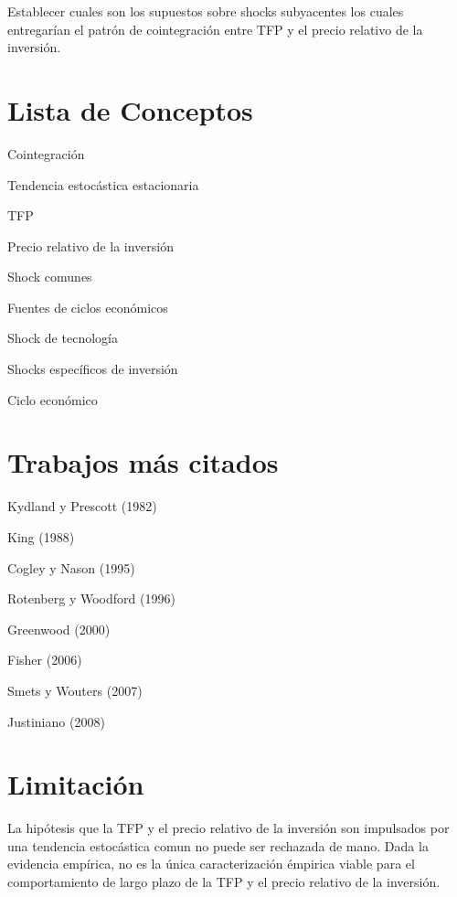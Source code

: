 \documentclass{article}
\begin{document}
Establecer cuales son los supuestos sobre shocks subyacentes los cuales entregarían el patrón de cointegración entre TFP y el precio relativo de la inversión.

\section{Lista de Conceptos}

Cointegración

Tendencia estocástica estacionaria

TFP

Precio relativo de la inversión

Shock comunes

Fuentes de ciclos económicos

Shock de tecnología

Shocks específicos de inversión

Ciclo económico

\section{Trabajos más citados}

Kydland y Prescott (1982)

King (1988)

Cogley y Nason (1995)

Rotenberg y Woodford (1996)

Greenwood (2000)

Fisher (2006)

Smets y Wouters (2007)

Justiniano (2008)

\section{Limitación}

La hipótesis que la TFP y el precio relativo de la inversión son impulsados por una tendencia estocástica comun no puede ser rechazada de mano. Dada la evidencia empírica, no es la única caracterización émpirica viable para el comportamiento de largo plazo de la TFP y el precio relativo de la inversión. 
\end{document}
